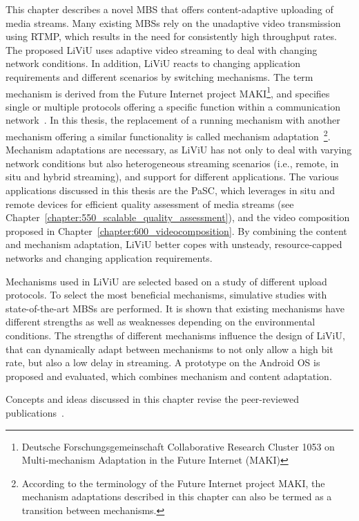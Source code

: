 This chapter describes a novel \ac{MBS} that offers content-adaptive uploading of media streams.
Many existing \ac{MBS}s rely on the unadaptive video transmission using \ac{RTMP}, which results in the need for consistently high throughput rates.
The proposed \acf{LiViU} uses adaptive video streaming to deal with changing network conditions.
In addition, \ac{LiViU} reacts to changing application requirements and different scenarios by switching mechanisms.
The term mechanism is derived from the Future Internet project MAKI\footnote{Deutsche Forschungsgemeinschaft Collaborative Research Cluster 1053 on Multi-mechanism Adaptation in the Future Internet (MAKI)}, and specifies single or multiple protocols offering a specific function within a communication network~\cite{Gross2013}.
In this thesis, the replacement of a running mechanism with another mechanism offering a similar functionality is called mechanism adaptation~\cite{Froemmgen2015}\footnote{According to the terminology of the Future Internet project MAKI, the mechanism adaptations described in this chapter can also be termed as a transition between mechanisms.}.
Mechanism adaptations are necessary, as \ac{LiViU} has not only to deal with varying network conditions but also heterogeneous streaming scenarios (i.e., remote, in situ and hybrid streaming), and support for different applications.
The various applications discussed in this thesis are the \ac{PaSC}, which leverages in situ and remote devices for efficient quality assessment of media streams (see Chapter~\ref{chapter:550_scalable_quality_assessment}), and the video composition proposed in Chapter~\ref{chapter:600_videocomposition}.
By combining the content and mechanism adaptation, \ac{LiViU} better copes with unsteady, resource-capped networks and changing application requirements.

Mechanisms used in \ac{LiViU} are selected based on a study of different upload protocols.
To  select the most beneficial mechanisms, simulative studies with state-of-the-art \ac{MBS}s are performed.
It is shown that existing mechanisms have different strengths as well as weaknesses depending on the environmental conditions.
The strengths of different mechanisms influence the design of \ac{LiViU}, that can dynamically adapt between mechanisms to not only allow a high bit rate, but also a low delay in streaming.
A prototype on the Android \ac{OS} is proposed and evaluated, which combines mechanism and content adaptation.

Concepts and ideas discussed in this chapter revise the peer-reviewed publications~\cite{Stohr2016,Wilk2014c,Wilk2016f,Wilk2015d}.